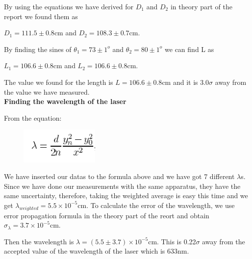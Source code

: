 \documentclass[11pt,a4paper]{article}
\begin{document}
{\begin{figure}[H]
\begin{center}
	\end{center}
\end{figure}
\par By using the equations we have derived for $D_1$ and $D_2$ in theory part of the report we found them as
\par $D_1=111.5\pm 0.8$cm and $D_2=108.3\pm0.7$cm.
\par By finding the sines of $\theta_1=73\pm1^o$ and $\theta_2=80\pm1^o$ we can find L as
\par $L_1=106.6\pm0.8$cm and $L_2=106.6\pm0.8$cm.
\par The value we found for the length is $L=106.6\pm0.8$cm and it is 3.0$\sigma$ away from the value we have measured.\\[\baselineskip]
\textbf{\small{Finding the wavelength of the laser}}
\par From the equation:
\begin{figure}[H]
	\begin{center}
		\includegraphics[scale=0.8]{lambda.png}
	\end{center}
\end{figure}
\par We have inserted our datas to the formula above and we have got 7 different $\lambda$s. Since we have done our measurements with the same apparatus, they have the same uncertainty, therefore, taking the weighted average is easy this time and we get $\lambda_{weighted}=5.5\times 10^{-5}$cm. To calculate the error of the wavelength, we use error propagation formula in the theory part of the reort and obtain $\sigma_{\lambda}=3.7\times 10^{-5}$cm.
\par Then the wavelength is  $\lambda=(5.5\pm3.7)\times 10^{-5}$cm. This is 0.22$\sigma$ away from the accepted value of the wavelength of the laser which is 633nm.
\begin{figure}[H]
	\begin{center}

\end{center}
\end{figure}}
\end{document}
